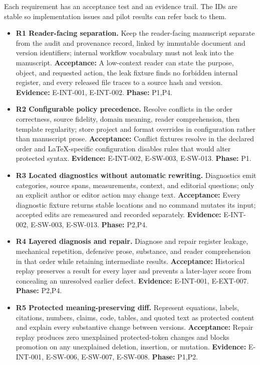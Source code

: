 \documentclass[11pt]{article}
\providecommand{\tightlist}{\setlength{\itemsep}{0pt}\setlength{\parskip}{0pt}}
\begin{document}
Each requirement has an acceptance test and an evidence trail. The IDs are stable so implementation issues and pilot results can refer back to them.

\begin{itemize}
\tightlist
\item
  \textbf{R1 Reader-facing separation.} Keep the reader-facing manuscript separate from the audit and provenance record, linked by immutable document and version identifiers; internal workflow vocabulary must not leak into the manuscript. \textbf{Acceptance:} A low-context reader can state the purpose, object, and requested action, the leak fixture finds no forbidden internal register, and every released file traces to a source hash and version. \textbf{Evidence:} E-INT-001, E-INT-002. \textbf{Phase:} P1,P4.
\item
  \textbf{R2 Configurable policy precedence.} Resolve conflicts in the order correctness, source fidelity, domain meaning, reader comprehension, then template regularity; store project and format overrides in configuration rather than manuscript prose. \textbf{Acceptance:} Conflict fixtures resolve in the declared order and LaTeX-specific configuration disables rules that would alter protected syntax. \textbf{Evidence:} E-INT-002, E-SW-003, E-SW-013. \textbf{Phase:} P1.
\item
  \textbf{R3 Located diagnostics without automatic rewriting.} Diagnostics emit categories, source spans, measurements, context, and editorial questions; only an explicit author or editor action may change text. \textbf{Acceptance:} Every diagnostic fixture returns stable locations and no command mutates its input; accepted edits are remeasured and recorded separately. \textbf{Evidence:} E-INT-002, E-SW-003, E-SW-013. \textbf{Phase:} P2,P4.
\item
  \textbf{R4 Layered diagnosis and repair.} Diagnose and repair register leakage, mechanical repetition, defensive prose, substance, and reader comprehension in that order while retaining intermediate results. \textbf{Acceptance:} Historical replay preserves a result for every layer and prevents a later-layer score from concealing an unresolved earlier defect. \textbf{Evidence:} E-INT-001, E-EXT-007. \textbf{Phase:} P2,P4.
\item
  \textbf{R5 Protected meaning-preserving diff.} Represent equations, labels, citations, numbers, claims, code, tables, and quoted text as protected content and explain every substantive change between versions. \textbf{Acceptance:} Repair replay produces zero unexplained protected-token changes and blocks promotion on any unexplained deletion, insertion, or mutation. \textbf{Evidence:} E-INT-001, E-SW-006, E-SW-007, E-SW-008. \textbf{Phase:} P1,P2.

\end{itemize}
\end{document}
